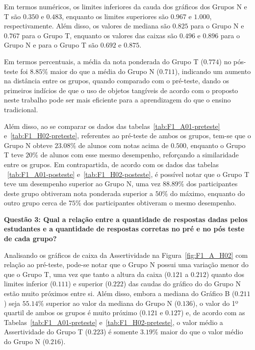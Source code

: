 Em termos numéricos, os limites inferiores da cauda dos gráficos dos Grupos N e T são $0.350$ e $0.483$, enquanto os limites superiores são $0.967$ e $1.000$, respectivamente. Além disso, os valores de mediana são $0.825$ para o Grupo N e $0.767$ para o Grupo T, enquanto os valores das caixas são $0.496$ e $0.896$ para o Grupo N e para o Grupo T são $0.692$ e $0.875$.

Em termos percentuais, a média da nota ponderada do Grupo T ($0.774$) no pós-teste foi $8.85\%$ maior do que a média do Grupo N ($0.711$), indicando um aumento na distância entre os grupos, quando comparado com o pré-teste, dando os primeiros indícios de que o uso de objetos tangíveis de acordo com o proposto neste trabalho pode ser mais eficiente para a aprendizagem do que o ensino tradicional. 

Além disso, ao se comparar os dados das tabelas~\ref{tab:F1_A01-preteste} e~\ref{tab:F1_H02-preteste}, referentes ao pré-teste de ambos os grupos, tem-se que o Grupo N obteve $23.08\%$ de alunos com notas acima de $0.500$, enquanto o Grupo T teve $20\%$ de alunos com esse mesmo desempenho, reforçando a similaridade entre os grupos. Em contrapartida, de acordo com os dados das tabelas ~\ref{tab:F1_A01-posteste} e~\ref{tab:F1_H02-posteste}, é possível notar que o Grupo T teve um desempenho superior ao Grupo N, uma vez $88.89\%$ dos participantes deste grupo obtiveram nota ponderada superior a $50\%$ do máximo, enquanto do outro grupo cerca de $75\%$ dos participantes obtiveram o mesmo desempenho.

\textbf{Questão 3: Qual a relação entre a quantidade de respostas dadas pelos estudantes e a quantidade de respostas corretas no pré e no pós teste de cada grupo?}

Analisando os gráficos de caixa da Assertividade na Figura~\ref{fig:F1_A_H02} com relação ao pré-teste, pode-se notar que o Grupo N possui uma variação menor do que o Grupo T, uma vez que tanto a altura da caixa ($0.121$ a $0.212$) quanto dos limites inferior ($0.111$) e superior ($0.222$) das caudas do gráfico do do Grupo N estão muito próximos entre si. Além disso, embora a mediana do Gráfico B ($0.211$) seja $55.14\%$ superior ao valor da mediana do Grupo N ($0.136$), o valor do 1º quartil de ambos os grupos é muito próximo ($0.121$ e $0.127$) e, de acordo com as Tabelas~\ref{tab:F1_A01-preteste} e~\ref{tab:F1_H02-preteste}, o valor médio a Assertividade do Grupo T ($0.223$) é somente $3.19\%$ maior do que o valor médio do Grupo N ($0.216$).

